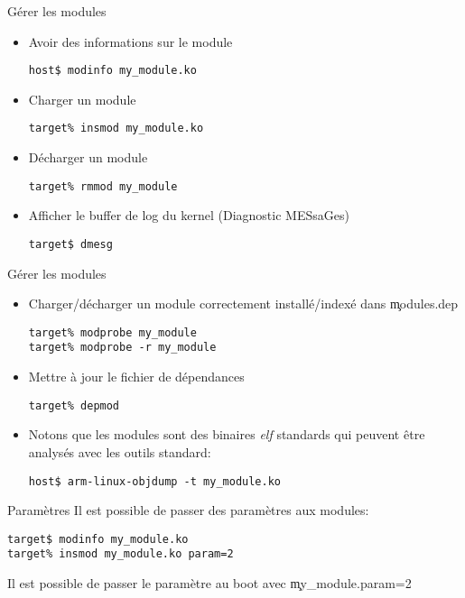 \begin{frame}[fragile=singleslide]{Gérer les modules}
  \begin{itemize} 
  \item Avoir des informations sur le module
    \begin{lstlisting}
host$ modinfo my_module.ko
    \end{lstlisting} %
  \item Charger un module
    \begin{lstlisting}
target% insmod my_module.ko
    \end{lstlisting} %
  \item Décharger un module
    \begin{lstlisting}
target% rmmod my_module
    \end{lstlisting}%
  \item Afficher le buffer de log du kernel (Diagnostic MESsaGes)
    \begin{lstlisting}
target$ dmesg
    \end{lstlisting} %
  \end{itemize}
\end{frame}

\begin{frame}[fragile=singleslide]{Gérer les modules}
  \begin{itemize} 
  \item Charger/décharger un  module correctement installé/indexé dans
    \c{modules.dep}
    \begin{lstlisting}
target% modprobe my_module
target% modprobe -r my_module
    \end{lstlisting} %
  \item Mettre à jour le fichier de dépendances
    \begin{lstlisting} 
target% depmod
    \end{lstlisting} %
  \item Notons que les  modules sont des binaires \emph{elf} standards
    qui peuvent être analysés avec les outils standard:
    \begin{lstlisting}
host$ arm-linux-objdump -t my_module.ko
    \end{lstlisting} 
  \end{itemize}
\end{frame}

\begin{frame}[fragile=singleslide]{Paramètres}
  Il est possible de passer des paramètres aux modules:
  \begin{lstlisting}
target$ modinfo my_module.ko 
target% insmod my_module.ko param=2  
  \end{lstlisting} %
  Il est possible de passer le paramètre au boot avec \c{my_module.param=2}
\end{frame}

